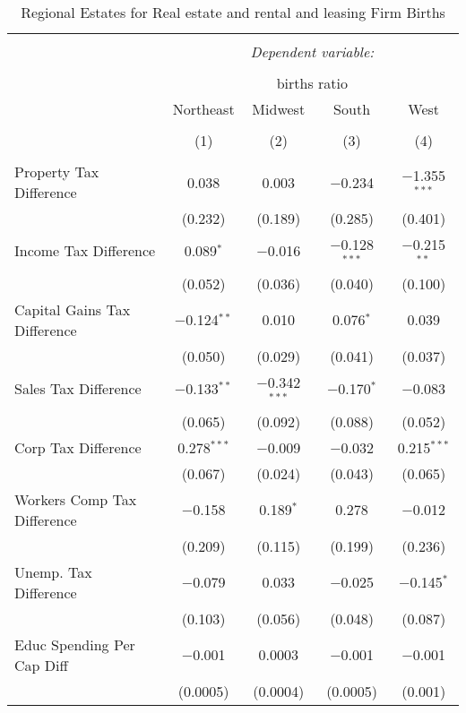 
\begin{table}[!htbp] \centering 
  \caption{Regional Estates for  Real estate and rental and leasing Firm Births} 
  \label{} 
\begin{tabular}{@{\extracolsep{5pt}}lcccc} 
\\[-1.8ex]\hline 
\hline \\[-1.8ex] 
 & \multicolumn{4}{c}{\textit{Dependent variable:}} \\ 
\cline{2-5} 
\\[-1.8ex] & \multicolumn{4}{c}{births ratio} \\ 
 & Northeast & Midwest & South & West \\ 
\\[-1.8ex] & (1) & (2) & (3) & (4)\\ 
\hline \\[-1.8ex] 
 Property Tax Difference & 0.038 & 0.003 & $-$0.234 & $-$1.355$^{***}$ \\ 
  & (0.232) & (0.189) & (0.285) & (0.401) \\ 
  Income Tax Difference & 0.089$^{*}$ & $-$0.016 & $-$0.128$^{***}$ & $-$0.215$^{**}$ \\ 
  & (0.052) & (0.036) & (0.040) & (0.100) \\ 
  Capital Gains Tax Difference & $-$0.124$^{**}$ & 0.010 & 0.076$^{*}$ & 0.039 \\ 
  & (0.050) & (0.029) & (0.041) & (0.037) \\ 
  Sales Tax Difference & $-$0.133$^{**}$ & $-$0.342$^{***}$ & $-$0.170$^{*}$ & $-$0.083 \\ 
  & (0.065) & (0.092) & (0.088) & (0.052) \\ 
  Corp Tax Difference & 0.278$^{***}$ & $-$0.009 & $-$0.032 & 0.215$^{***}$ \\ 
  & (0.067) & (0.024) & (0.043) & (0.065) \\ 
  Workers Comp Tax Difference & $-$0.158 & 0.189$^{*}$ & 0.278 & $-$0.012 \\ 
  & (0.209) & (0.115) & (0.199) & (0.236) \\ 
  Unemp. Tax Difference & $-$0.079 & 0.033 & $-$0.025 & $-$0.145$^{*}$ \\ 
  & (0.103) & (0.056) & (0.048) & (0.087) \\ 
  Educ Spending Per Cap Diff & $-$0.001 & 0.0003 & $-$0.001 & $-$0.001 \\ 
  & (0.0005) & (0.0004) & (0.0005) & (0.001) \\ 

\end{tabular}
\end{table}
